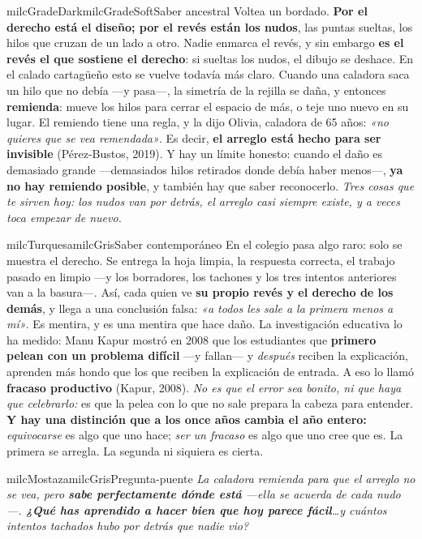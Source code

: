 \documentclass[11pt,letterpaper]{article}
\begin{document}
\begin{softbox}{milcGradeDark}{milcGradeSoft}{Saber ancestral}
Voltea un bordado. \textbf{Por el derecho está el diseño; por el revés están los nudos}, las puntas sueltas, los hilos que cruzan de un lado a otro. Nadie enmarca el revés, y sin embargo \textbf{es el revés el que sostiene el derecho}: si sueltas los nudos, el dibujo se deshace. En el calado cartagüeño esto se vuelve todavía más claro. Cuando una caladora saca un hilo que no debía ---y pasa---, la simetría de la rejilla se daña, y entonces \textbf{remienda}: mueve los hilos para cerrar el espacio de más, o teje uno nuevo en su lugar. El remiendo tiene una regla, y la dijo Olivia, caladora de 65 años: \emph{«no quieres que se vea remendada»}. Es decir, \textbf{el arreglo está hecho para ser invisible} (Pérez-Bustos, 2019). Y hay un límite honesto: cuando el daño es demasiado grande ---demasiados hilos retirados donde debía haber menos---, \textbf{ya no hay remiendo posible}, y también hay que saber reconocerlo. \emph{Tres cosas que te sirven hoy: los nudos van por detrás, el arreglo casi siempre existe, y a veces toca empezar de nuevo.}
\end{softbox}

\begin{softbox}{milcTurquesa}{milcGris}{Saber contemporáneo}
En el colegio pasa algo raro: solo se muestra el derecho. Se entrega la hoja limpia, la respuesta correcta, el trabajo pasado en limpio ---y los borradores, los tachones y los tres intentos anteriores van a la basura---. Así, cada quien ve \textbf{su propio revés y el derecho de los demás}, y llega a una conclusión falsa: \emph{«a todos les sale a la primera menos a mí»}. Es mentira, y es una mentira que hace daño. La investigación educativa lo ha medido: Manu Kapur mostró en 2008 que los estudiantes que \textbf{primero pelean con un problema difícil} ---y fallan--- y \emph{después} reciben la explicación, aprenden más hondo que los que reciben la explicación de entrada. A eso lo llamó \textbf{fracaso productivo} (Kapur, 2008). \emph{No es que el error sea bonito, ni que haya que celebrarlo:} es que la pelea con lo que no sale prepara la cabeza para entender. \textbf{Y hay una distinción que a los once años cambia el año entero:} \emph{equivocarse} es algo que uno hace; \emph{ser un fracaso} es algo que uno cree que es. La primera se arregla. La segunda ni siquiera es cierta.
\end{softbox}

\begin{softbox}{milcMostaza}{milcGris}{Pregunta-puente}
\textit{La caladora remienda para que el arreglo no se vea, pero \textbf{sabe perfectamente dónde está} ---ella se acuerda de cada nudo---. \textbf{¿Qué has aprendido a hacer bien que hoy parece fácil}\ldots y cuántos intentos tachados hubo por detrás que nadie vio?}
\end{softbox}
\end{document}
